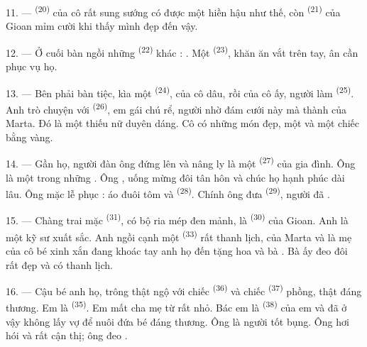11. ---  \textsuperscript{(20)} của cô rất sung sướng có được một
 hiền hậu như thế, còn  \textsuperscript{(21)} của Gioan
mỉm cười khi thấy  mình đẹp đến vậy.

12. --- Ở cuối bàn ngồi những  \textsuperscript{(22)} khác :
. Một 
\textsuperscript{(23)}, khăn ăn vắt trên tay, ân cần phục vụ họ.

\VUsaut{3.0mm}

13. --- Bên phải bàn tiệc, kìa một  \textsuperscript{(24)},
 của cô dâu, rồi  của cô ấy, người làm 
\textsuperscript{(25)}. Anh trò chuyện với  \textsuperscript{(26)},
em gái chú rể, người nhờ đám cưới này mà thành  của Marta. Đó là một
thiếu nữ duyên dáng. Cô có những món  đẹp, một  và một chiếc  bằng vàng.

14. --- Gần họ, người đàn ông đứng lên và nâng ly là một 
\textsuperscript{(27)} của gia đình. Ông là một trong những . Ông , uống mừng  đôi tân hôn và
chúc họ hạnh phúc dài lâu. Ông mặc lễ phục : áo đuôi tôm và 
\textsuperscript{(28)}. Chính ông đưa  \textsuperscript{(29)}, người đã
.

15. --- Chàng trai mặc  \textsuperscript{(31)}, có bộ ria mép đen
mảnh, là  \textsuperscript{(30)} của Gioan. Anh là một kỹ sư xuất sắc.
Anh ngồi cạnh một  \textsuperscript{(33)} rất thanh lịch,  của Marta và là mẹ của cô bé xinh xắn đang khoác tay anh họ đến tặng hoa và
 bà . Bà ấy đeo đôi  rất đẹp và
có  thanh lịch.

16. --- Cậu bé anh họ, trông thật ngộ với chiếc 
\textsuperscript{(36)} và chiếc  \textsuperscript{(37)} phồng, thật
đáng thương. Em là  \textsuperscript{(35)}. Em mất cha mẹ từ rất nhỏ.
Bác em là  \textsuperscript{(38)} của em và đã ở vậy không lấy vợ
để nuôi đứa bé đáng thương. Ông là người tốt bụng. Ông hơi hói và rất cận thị; ông đeo
.

